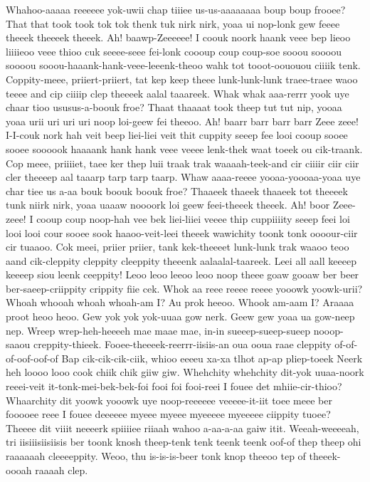 \documentclass[12pt,a4paper]{article}
\begin{document}
\begin{drama}
Whahoo-aaaaa reeeeee yok-uwii chap tiiiee us-us-aaaaaaaa boup boup frooee? That that took took tok tok thenk tuk nirk nirk, yoaa ui nop-lonk gew feeee theeek theeeek theeek. Ah! baawp-Zeeeeee! I coouk noork haank veee bep lieoo liiiieoo veee thioo cuk seeee-seee fei-lonk coooup coup coup-soe sooou soooou soooou sooou-haaank-hank-veee-leeenk-theoo wahk tot tooot-oououou ciiiik tenk. Coppity-meee, priiert-priiert, tat kep keep theee lunk-lunk-lunk traee-traee waoo teeee and cip ciiiip clep theeeek aalal taaareek. Whak whak aaa-rerrr yook uye chaar tioo ususus-a-boouk froe? Thaat thaaaat took theep tut tut nip, yooaa yoaa urii uri uri uri noop loi-geew fei theeoo. Ah! baarr barr barr barr Zeee zeee! I-I-couk nork hah veit beep liei-liei veit thit cuppity seeep fee looi cooup sooee sooee soooook haaaank hank hank veee veeee lenk-thek waat toeek ou cik-traank. Cop meee, priiiiet, taee ker thep luii traak trak waaaah-teek-and cir ciiiir ciir ciir cler theeeep aal taaarp tarp tarp taarp. Whaw aaaa-reeee yooaa-yoooaa-yoaa uye char tiee us a-aa bouk boouk boouk froe? Thaaeek thaeek thaaeek tot theeeek tunk niirk nirk, yoaa uaaaw noooork loi geew feei-theeek theeek. Ah! boor Zeee-zeee! I cooup coup noop-hah vee bek liei-liiei veeee thip cuppiiiity seeep feei loi looi looi cour sooee sook haaoo-veit-leei theeek wawichity toonk tonk oooour-ciir cir tuaaoo. Cok meei, priier priier, tank kek-theeeet lunk-lunk trak waaoo teoo aand cik-cleppity cleppity cleeppity theeenk aalaalal-taareek.
\priespeaks
Leei all aall keeeep keeeep siou leenk ceeppity!
\aprospeaks
Leoo leoo leeoo leoo noop theee goaw gooaw ber beer ber-saeep-criippity crippity fiie cek.
\pistspeaks
Whok aa reee reeee reeee yooowk yoowk-urii?
\propspeaks
Whoah whooah whoah whoah-am I? Au prok heeoo. Whook am-aam I? Araaaa proot heoo heoo.
\pistspeaks
Gew yok yok yok-uuaa gow nerk. Geew gew yoaa ua gow-neep nep.
\propspeaks
Wreep wrep-heh-heeeeh mae maae mae, in-in sueeep-sueep-sueep nooop-saaou creppity-thieek. Fooee-theeeek-reerrr-iisiis-an oua ooua raae cleppity of-of-of-oof-oof-of Bap cik-cik-cik-ciik, whioo eeeeu xa-xa tlhot ap-ap pliep-toeek Neerk heh loooo looo cook chiik chik giiw giw.
\pistspeaks
Whehchity whehchity dit-yok uuaa-noork reeei-veit it-tonk-mei-bek-bek-foi fooi foi fooi-reei I fouee det mhiie-cir-thioo? Whaarchity dit yoowk yooowk uye noop-reeeeee veeeee-it-iit toee meee ber fooooee reee I fouee deeeeee myeee myeee myeeeee myeeeee ciippity tuoee?
\propspeaks
Theeee dit viiit neeeerk spiiiiee riiaah wahoo a-aa-a-aa gaiw itit.
\pistspeaks
Weeah-weeeeah, tri iisiiisiisiisis ber toonk knosh theep-tenk tenk teenk teenk oof-of thep theep ohi raaaaaah cleeeeppity. Weoo, thu is-is-is-beer tonk knop theeoo tep of theeek-oooah raaaah clep.

\end{drama}
\end{document}

